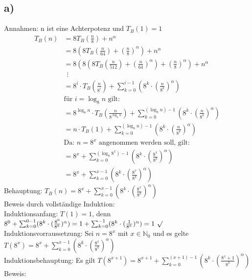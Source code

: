 \documentclass[a4paper]{scrartcl}
\begin{document}
\subsection*{a)}
Annahmen: n ist eine Achterpotenz und $T_B(1)=1$\\
\begin{align*}
T_B(n)&=8T_B(\frac{n}{8})+n^{\alpha}\\
&=8(8T_B(\frac{n}{64})+(\frac{n}{8})^{\alpha})+n^{\alpha}\\
&=8(8(8T_B(\frac{n}{512})+(\frac{n}{64})^{\alpha})+(\frac{n}{8})^{\alpha})+n^{\alpha}\\
& \ \ \vdots\\
&=8^i \cdot  T_B(\frac{n}{8^i}) + \sum_{k=0}^{i-1} (8^k \cdot (\frac{n}{8^k})^{\alpha})\\
&\textrm{für } i = \log_{8}n \textrm{ gilt:}\\
&=8^{\log_{8}n} \cdot  T_B(\frac{n}{8^{\log_{8}n}}) + \sum_{k=0}^{(\log_{8}n)-1} (8^k \cdot (\frac{n}{8^k})^{\alpha})\\
&=n \cdot  T_B(1) + \sum_{k=0}^{(\log_{8}n)-1} (8^k \cdot (\frac{n}{8^k})^{\alpha})\\
&\textrm{Da: } n=8^x \textrm{ angenommen werden soll, gilt:}\\
&=8^{x} + \sum_{k=0}^{(\log_{8}8^x)-1} (8^k \cdot (\frac{8^x}{8^k})^{\alpha})\\
&=8^{x} + \sum_{k=0}^{x-1} (8^k \cdot (\frac{8^x}{8^k})^{\alpha})
\end{align*}
Behauptung: $T_B(n)=8^{x} + \sum_{k=0}^{x-1} (8^k \cdot (\frac{8^x}{8^k})^{\alpha})$\\
Beweis durch vollständige Induktion:\\
Induktionsanfang: $T(1)=1$, denn $8^{0} + \sum_{k=0}^{0-1} (8^k \cdot (\frac{8^0}{8^k})^{\alpha})=1 + \sum_{k=0}^{-1} (8^k \cdot (\frac{1}{8^k})^{\alpha})=1 \ \surd$\\
Induktionsvorraussetzung: Sei $n=8^x$ mit $x \in \mathbb{N}_0$ und es gelte $T(8^x)=8^{x} + \sum_{k=0}^{x-1} (8^k \cdot (\frac{8^x}{8^k})^{\alpha})$\\
Induktionsbehauptung: Es gilt $T(8^{x+1})=8^{x+1} + \sum_{k=0}^{(x+1)-1} (8^k \cdot (\frac{8^x+1}{8^k})^{\alpha})$\\
Beweis:
\end{document}
